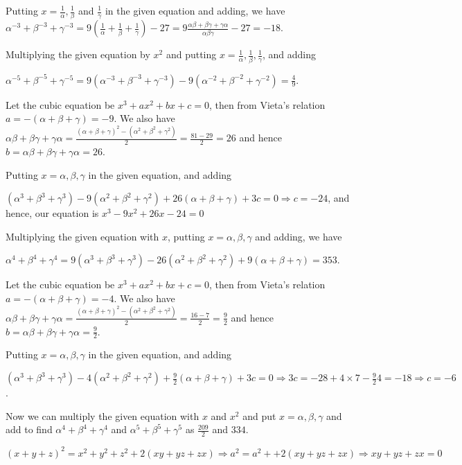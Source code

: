   Putting $x = \frac{1}{\alpha}, \frac{1}{\beta}$ and $\frac{1}{\gamma}$ in the given equation and adding,
  we have $\alpha^{-3} + \beta^{-3} + \gamma^{-3} = 9\left(\frac{1}{\alpha} + \frac{1}{\beta} +
  \frac{1}{\gamma}\right) - 27 = 9\frac{\alpha\beta + \beta\gamma + \gamma\alpha}{\alpha\beta\gamma} - 27 =
  -18$.

  Multiplying the given equation by $x^2$ and putting $x = \frac{1}{\alpha}, \frac{1}{\beta},
  \frac{1}{\gamma}$, and adding

  $\alpha^{-5} + \beta^{-5} + \gamma^{-5} = 9(\alpha^{-3} + \beta^{-3} + \gamma^{-3}) - 9(\alpha^{-2} +
  \beta^{-2} + \gamma^{-2}) = \frac{4}{9}$.
\item Let the cubic equation be $x^3 + ax^2 + bx + c = 0$, then from Vieta's relation $a = -(\alpha + \beta
  + \gamma) = -9$. We also have $\alpha\beta + \beta\gamma + \gamma\alpha = \frac{(\alpha + \beta +
    \gamma)^2 - (\alpha^2 + \beta^2 + \gamma^2)}{2} = \frac{81 - 29}{2} = 26$ and hence $b = \alpha\beta +
  \beta\gamma + \gamma\alpha = 26$.

  Putting $x = \alpha, \beta, \gamma$ in the given equation, and adding

  $(\alpha^3 + \beta^3 + \gamma^3) - 9(\alpha^2 + \beta^2 + \gamma^2) + 26(\alpha + \beta + \gamma) + 3c = 0
  \Rightarrow c = -24$, and hence, our equation is $x^3 - 9x^2 + 26x - 24 = 0$

  Multiplying the given equation with $x$, putting $x = \alpha, \beta, \gamma$ and adding, we have

  $\alpha^4 + \beta^4 + \gamma^4 = 9(\alpha^3 + \beta^3 + \gamma^3) - 26(\alpha^2 + \beta^2 + \gamma^2) +
  9(\alpha + \beta + \gamma) = 353$.
\item Let the cubic equation be $x^3 + ax^2 + bx + c = 0$, then from Vieta's relation $a = -(\alpha + \beta
  + \gamma) = -4$. We also have $\alpha\beta + \beta\gamma + \gamma\alpha = \frac{(\alpha + \beta +
    \gamma)^2 - (\alpha^2 + \beta^2 + \gamma^2)}{2} = \frac{16 - 7}{2} = \frac{9}{2}$ and hence $b =
  \alpha\beta + \beta\gamma + \gamma\alpha = \frac{9}{2}$.

  Putting $x = \alpha, \beta, \gamma$ in the given equation, and adding

  $(\alpha^3 + \beta^3 + \gamma^3) - 4(\alpha^2 + \beta^2 + \gamma^2) + \frac{9}{2}(\alpha + \beta + \gamma)
  + 3c = 0
  \Rightarrow 3c = -28 + 4\times7 -\frac{9}{2}4 = -18\Rightarrow c = -6$.

  Now we can multiply the given equation with $x$ and $x^2$ and put $x = \alpha, \beta, \gamma$ and add to
  find $\alpha^4 + \beta^4 + \gamma^4$ and $\alpha^5 + \beta^5 + \gamma^5$ as $\frac{209}{2}$ and $334$.
\item $(x + y + z)^2 = x^2 + y^2 + z^2 + 2(xy + yz + zx) \Rightarrow a^2 = a^2 + + 2(xy + yz + zx)
  \Rightarrow xy + yz + zx = 0$

